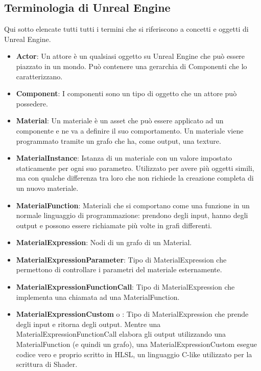 \documentclass[main.tex]{subfiles}
\begin{document}
\clearpage
\subsection{Terminologia di Unreal Engine}\label{subsec:1_dataStructsUE}
Qui sotto elencate tutti tutti i termini che si riferiscono a concetti e oggetti di Unreal Engine.
\begin{itemize}
    \item \textbf{Actor}: Un attore è un qualsiasi oggetto su Unreal Engine che può essere piazzato in un mondo. Può contenere una gerarchia di Componenti che lo caratterizzano.
    \item \textbf{Component}: I componenti sono un tipo di oggetto che un attore può possedere.
    \item \textbf{Material}: Un materiale è un asset che può essere applicato ad un componente e ne va a definire il suo comportamento. Un materiale viene programmato tramite un grafo che ha, come output, una texture.
    \item \textbf{MaterialInstance}: Istanza di un materiale con un valore impostato staticamente per ogni suo parametro. Utilizzato per avere più oggetti simili, ma con qualche differenza tra loro che non richiede la creazione completa di un nuovo materiale.
    \item \textbf{MaterialFunction}: Materiali che si comportano come una funzione in un normale linguaggio di programmazione: prendono degli input, hanno degli output e possono essere richiamate più volte in grafi differenti.
    \item \textbf{MaterialExpression}: Nodi di un grafo di un Material.
    \item \textbf{MaterialExpressionParameter}: Tipo di MaterialExpression che permettono di controllare i parametri del materiale esternamente.
    \item \textbf{MaterialExpressionFunctionCall}: Tipo di MaterialExpression che implementa una chiamata ad una MaterialFunction.
    \item \textbf{MaterialExpressionCustom} o : Tipo di MaterialExpression che prende degli input e ritorna degli output. Mentre una MaterialExpressionFunctionCall elabora gli output utilizzando una MaterialFunction (e quindi un grafo), una MaterialExpressionCustom esegue codice vero e proprio scritto in HLSL, un linguaggio C-like utilizzato per la scrittura di Shader.
\end{itemize}
\end{document}
